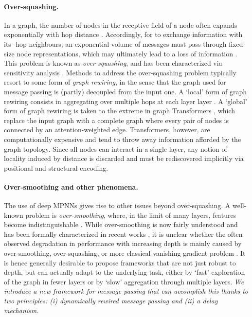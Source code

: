 \documentclass{article}
\theoremstyle{plain}
\theoremstyle{definition}
\theoremstyle{remark}
\begin{document}
\paragraph{Over-squashing.}
\label{sec:oversquashing}
In a graph, the number of nodes in the receptive field of a node  often expands exponentially with hop distance . Accordingly, for  to exchange information with its -hop neighbours, an exponential volume of messages must pass through fixed-size node representations, which may ultimately lead to a loss of information \citep{alon2020bottleneck}. This problem is known as {\em over-squashing}, and has been characterized  via sensitivity analysis \citep{topping2021understanding}.
Methods to address the over-squashing problem typically resort to some form of {\em graph rewiring}, in the sense that the graph used for message passing is (partly) decoupled from the input one. A `local' form of graph rewiring consists in  aggregating over multiple hops at each layer layer \citep{abu2019mixhop, abu2020n, zhang2021nested, abboud2022shortest}. A `global' form of graph rewiring is taken to the extreme in graph Transformers \cite{ying2021transformers,kreuzer2021rethinking,rampavsek2022recipe}, which
replace the input graph with a complete graph where every pair of nodes is connected by an attention-weighted edge.
Transformers, however, are computationally expensive and tend to throw away information afforded by the graph topology. Since all nodes can interact in a single layer, any notion of locality induced by distance  is discarded and must be rediscovered implicitly via positional and structural encoding.



\paragraph{Over-smoothing and other phenomena.} The use of deep MPNNs gives rise to other issues beyond over-squashing. A well-known problem is {\em over-smoothing}, where, in the limit of many layers, features become indistinguishable \citep{nt2019revisiting, Oono2019}. While over-smoothing is now fairly understood and has been formally characterized in recent works \citep{bodnar2022neural,cai2020note,di2022graph,rusch2022gradient}, it is unclear whether the often observed degradation in performance with increasing depth is mainly caused by over-smoothing,
over-squashing, or more classical vanishing gradient problem \citep{di2023over}.
It is hence generally desirable to propose frameworks that are not just robust to depth, but can actually adapt to the underlying task, either by `fast' exploration of the graph in fewer layers or by
`slow' aggregation through multiple layers. {\em We introduce a new framework for message-passing that can accomplish this thanks to two principles: (i) dynamically rewired message passing and (ii) a delay mechanism.}
\end{document}
